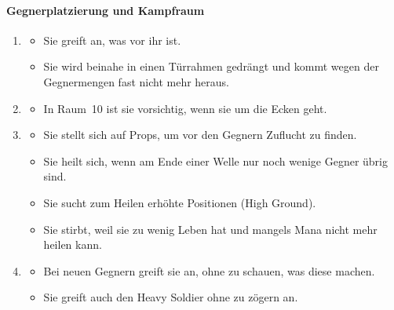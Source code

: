 \documentclass[../Main.tex]{subfiles}
\begin{document}
\paragraph{Gegnerplatzierung und Kampfraum}
\begin{enumerate}[label=\textbf{B\arabic*}, leftmargin=1.5cm, itemsep=0.8em, resume]
\item
\begin{itemize}[nosep]
\item Sie greift an, was vor ihr ist.
\item Sie wird beinahe in einen Türrahmen gedrängt und kommt wegen der Gegnermengen fast nicht mehr heraus.
\end{itemize}
\item
\begin{itemize}[nosep]
\item In Raum~10 ist sie vorsichtig, wenn sie um die Ecken geht.
\end{itemize}
\item
\begin{itemize}[nosep]
\item Sie stellt sich auf Props, um vor den Gegnern Zuflucht zu finden.
\item Sie heilt sich, wenn am Ende einer Welle nur noch wenige Gegner übrig sind.
\item Sie sucht zum Heilen erhöhte Positionen (High Ground).
\item Sie stirbt, weil sie zu wenig Leben hat und mangels Mana nicht mehr heilen kann.
\end{itemize}
\item
\begin{itemize}[nosep]
\item Bei neuen Gegnern greift sie an, ohne zu schauen, was diese machen.
\item Sie greift auch den Heavy Soldier ohne zu zögern an.
\end{itemize}
\end{enumerate}
\end{document}
